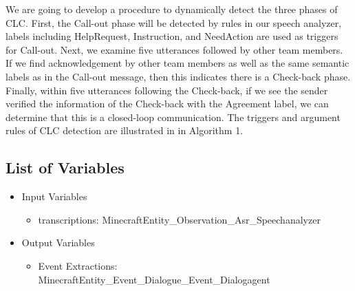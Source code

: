 We are going to develop a procedure to dynamically detect the three phases of
CLC. First, the Call-out phase will be detected by rules in our speech
analyzer, labels including HelpRequest, Instruction, and NeedAction are used as
triggers for Call-out. Next, we examine five utterances followed by other team
members. If we find acknowledgement by other team members as well as the same
semantic labels as in the Call-out message, then this indicates there is a
Check-back phase. Finally, within five utterances following the Check-back, if
we see the sender verified the information of the Check-back with the Agreement
label, we can determine that this is a closed-loop communication. The triggers
and argument rules of CLC detection are illustrated in
in Algorithm 1.



\subsection{List of Variables}

\begin{itemize}
    \item Input Variables
    \begin{itemize}
        \item transcriptions: MinecraftEntity\_Observation\_Asr\_Speechanalyzer
    \end{itemize}
    \item Output Variables
    \begin{itemize}
        \item Event Extractions: MinecraftEntity\_Event\_Dialogue\_Event\_Dialogagent
    \end{itemize}
\end{itemize}


